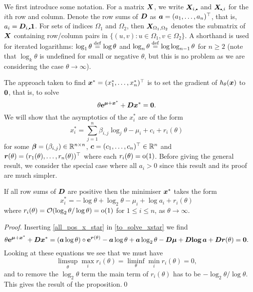 We first introduce some notation. For a matrix $\bm{X}$, we write
$\bfX_{i,\sbullet}$ and $\bfX_{\sbullet,i}$ for the $i$th row and
column. Denote the row sums of $\bm{D}$ as $\bm{a} = (a_1,\dots,a_n)^\top$, that
is, $a_i=\bfD_{i,\sbullet} \bfone$. For sets of indices $\Omega_1$ and
$\Omega_2$, then $\bm{X}_{\Omega_1,\Omega_2}$ denotes the submatrix of $\bm{X}$
containing row/column pairs in $\{ (u,v) : u \in \Omega_1, v \in \Omega_2\}$.
A shorthand is used for iterated logarithms: $\log_1 \theta \overset{\mathrm{def}}{=} \log
\theta$ and $\log_n \theta \overset{\mathrm{def}}{=} \log \log_{n-1} \theta$ for $n \ge 2$ (note
that $\log_k \theta$ is undefined for small or negative $\theta$, but this
is no problem as we are considering the case $\theta \to \infty$).

The approach taken to find $\bm{x}^*=(x_1^*,\dots,x_n^*)^\top$ is to set the
gradient of $h_\theta(\bm{x})$ to $\bm{0}$, that is, to solve
\begin{equation} \label{to_solve_xstar}
	\theta \bm{\mathrm{e}}^{\bm{\mu} + \bm{x}^*} + \bm{D} \bm{x}^* = \bm{0} .
\end{equation}
We will show that the asymptotics of the $x_i^*$ are of the form
\begin{equation} \label{general_form}
	x_i^* = \sum_{j=1}^{n} \beta_{i,j} \log_j \theta - \mu_i + c_i + r_i(\theta)
\end{equation}
for some $\bm{\beta} = (\beta_{i,j}) \in \mathbb{R}^{n \times n}$, $\bm{c} = (c_1, \dots,
c_n)^\top \in \mathbb{R}^n$ and $\bm{r}(\theta) = (r_1(\theta), \dots, r_n(\theta))^\top$
where each $r_i(\theta) = {\mathrm{o}}(1)$.  Before giving the general result, we
consider the special case where all $a_i>0$ since this result and its proof
are much simpler.

\begin{proposition} \label{all_pos_prop}
If all row sums of $\bm{D}$ are positive then the minimiser $\bm{x}^*$ takes the form
\begin{equation} \label{all_pos_x_star}
    x_i^* = {-}\log \theta + \log_2 \theta - \mu_i + \log a_i + r_i(\theta)
\end{equation}
where $r_i(\theta) = {\mathcal{O}}(\log_2 \theta / \log \theta) = {\mathrm{o}}(1)$ for $1 \leq i
\leq n$, as $\theta \to \infty$.
\end{proposition}

\begin{proof}
Inserting \eqref{all_pos_x_star} in \eqref{to_solve_xstar} we find
\[
    \theta \bm{\mathrm{e}}^{\bm{\mu} + \bm{x}^*} + \bm{D} \bm{x}^*
    = (\bm{a} \log \theta) \circ \bm{\mathrm{e}}^{\bm{r}(\theta)} - \bm{a} \log \theta
+ \bm{a} \log_2 \theta - \bm{D}  \bm{\mu} + \bm{D}  \bm{\mathrm{log}}\, \bm{a} + \bm{D} \bm{r}(\theta) = \bm{0} .
\]
Looking at these equations we see that we must have
%
\[
 \limsup_\theta \max_i r_i(\theta) = \liminf_\theta \min_i r_i(\theta) = 0,
\]
%
and to remove the $\log_2 \theta$ term the main term of $r_i(\theta)$ has to
be $-\log_2 \theta /\log \theta$. This gives the result of the
proposition.\qed
\end{proof}

